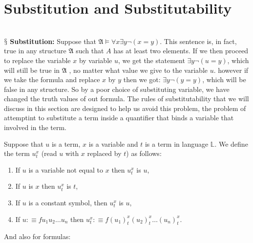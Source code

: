 \documentclass[9pt,a4paper, twocolumn]{article}
\newcommand{\newpoint}[1]{\ \\ \indent$\mathsection$ \textbf{#1}}
\newcommand{\curveL}{\mathbb{L} }
\newcommand{\curveA}{\mathfrak{A} }
\begin{document}
    \section*{Substitution and Substitutability}
        \newpoint{Substitution:}
            Suppose that $\curveA\vDash \forall x\exists y\neg(x=y)$. This sentence is, in fact, true in any structure $\curveA$ such that $A$ has at least two elements. If we then proceed to replace the variable $x$ by variable $u$, we get the statement $\exists y\neg(u=y)$, which will still be true in $\curveA$ , no matter what value we give to the variable $u$. however if we take the formula and replace $x$ by $y$ then we got: $\exists y\neg(y=y)$, which will be false in any structure. So by a poor choice of substituting variable, we have changed the truth values of out formula. The rules of substitutability that we will discuss in this section are designed to help us avoid this problem, the problem of attemptint to substitute a term inside a quantifier that binds a variable that involved in the term.
            \begin{define} 
                Suppose that $u$ is a term, $x$ is a variable and $t$ is a term in language $\curveL$. We define the term $u^x_t$ (read $u$ with $x$ replaced by $t$) as follows:
                \begin{enumerate}
                    \item If $u$ is a variable not equal to $x$ then $u^x_t$ is $u$,
                    \item If $u$ is $x$ then $u^x_t$ is $t$,
                    \item If $u$ is a constant symbol, then $u^x_t$ is $u$,
                    \item If $u:\equiv fu_1u_2\dots u_n$ then  $u^x_t :\equiv f(u_1)^x_t(u_2)^x_t\dots(u_n)^x_t$.
                \end{enumerate}
            \end{define}
            And also for formulas:
\end{document}
